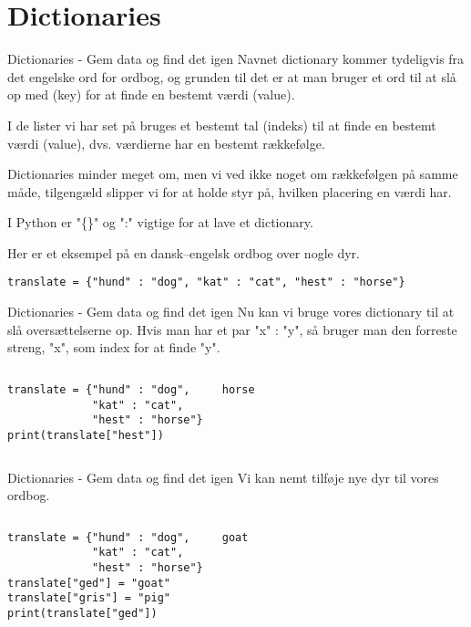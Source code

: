 \section{Dictionaries}

\begin{frame}[fragile]{Dictionaries - Gem data og find det igen}
	Navnet dictionary kommer tydeligvis fra det engelske ord for ordbog, og grunden til det er at man bruger et ord til at slå op med (key) for at finde en bestemt værdi (value). 
	
	\pause
	
	I de lister vi har set på bruges et bestemt tal (indeks) til at finde en bestemt værdi (value), dvs. værdierne har en bestemt rækkefølge.
	
	\pause
	
	Dictionaries minder meget om, men vi ved ikke noget om rækkefølgen på samme måde, tilgengæld slipper vi for at holde styr på, hvilken placering en værdi har.
	\pause
	
	I Python er "\{\}" og ":" vigtige for at lave et dictionary.
	
	Her er et eksempel på en dansk--engelsk ordbog over nogle dyr.
	\begin{lstlisting}[style=python]
translate = {"hund" : "dog", "kat" : "cat", "hest" : "horse"}
	\end{lstlisting}
\end{frame}

\begin{frame}[fragile]{Dictionaries - Gem data og find det igen}
	Nu kan vi bruge vores dictionary til at slå oversættelserne op. Hvis man har et par "x" : "y", så bruger man den forreste streng, "x", som index for at finde "y".
	\begin{columns}
		\begin{lstlisting}[style=python]
translate = {"hund" : "dog", 
             "kat" : "cat", 
             "hest" : "horse"}
print(translate["hest"])
		\end{lstlisting}
		
		\pause
		\begin{lstlisting}[style=python]
horse
		\end{lstlisting}
	\end{columns}	
\end{frame}

\begin{frame}[fragile]{Dictionaries - Gem data og find det igen}
	Vi kan nemt tilføje nye dyr til vores ordbog.
	\begin{columns}
		\column{0.5\textwidth}
		\begin{lstlisting}[style=python]
translate = {"hund" : "dog", 
             "kat" : "cat", 
             "hest" : "horse"}
translate["ged"] = "goat"
translate["gris"] = "pig"
print(translate["ged"])
		\end{lstlisting}
		
		\pause
		\column{0.3\textwidth}
		\begin{lstlisting}[style=python]
goat
		\end{lstlisting}
	\end{columns}	
\end{frame}

